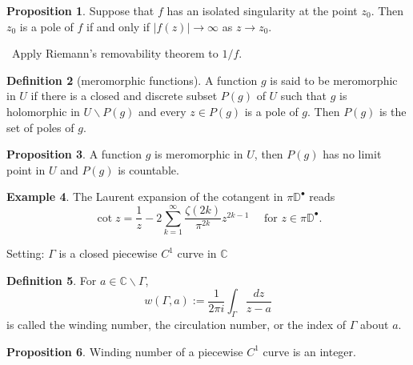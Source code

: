 \documentclass[12pt,a4paper]{book}
\newenvironment{prooff}{{\noindent\it\textcolor{cyan!40!black}{Proof}:}\,}{\par}
\theoremstyle{definition}
\newtheorem{defn}{Definition}[section]
\newtheorem{prop}[defn]{Proposition}
\newtheorem{exam}[defn]{Example}
\begin{document}
\begin{prop}
    Suppose that $f$ has an isolated singularity at the point $z_0$. Then $z_0$ is a pole of $f$ if and only if $|f(z)| \rightarrow \infty$ as $z \rightarrow z_0$. 

\end{prop}
\begin{prooff}
    Apply Riemann's removability theorem to $1/f$.
\end{prooff}


\begin{defn}[meromorphic functions]
    A function $g$ is said to be meromorphic in $U$ 
    if there is a closed and discrete 
    subset $P(g)$ of $U$ such that  
    $g$ is holomorphic in $U \backslash P(g)$ and 
    every $z \in P(g)$ is a pole of $g$. 
    Then $P(g)$ is the set of poles of $g$.
\end{defn}
\begin{prop}
    A function $g$ is meromorphic in $U$, then $P(g)$ has no limit point in $U$ and $P(g)$ is countable.  
\end{prop}
\begin{exam}
    The Laurent expansion of the cotangent in $\pi \mathbb{D}^{\bullet}$ reads
    $$
    \cot z=\frac{1}{z}-2 \sum_{k=1}^{\infty} \frac{\zeta(2 k)}{\pi^{2 k}} z^{2 k-1} \quad \text { for } z \in \pi \mathbb{D}^{\bullet} .
    $$
\end{exam}
Setting: $\Gamma$ is a closed piecewise $C^1$ curve in $\mathbb{C}$
\begin{defn}
    For $a \in \mathbb{C} \backslash \Gamma$,
    $$
    w(\Gamma, a):=\frac{1}{2 \pi i} \int_{\Gamma} \frac{d z}{z-a}
    $$
    is called the winding number, the circulation number, or the index of $\Gamma$ about $a$.
\end{defn}
\begin{prop}
    Winding number of a piecewise $C^1$ curve is an integer. 
\end{prop}
\end{document}
